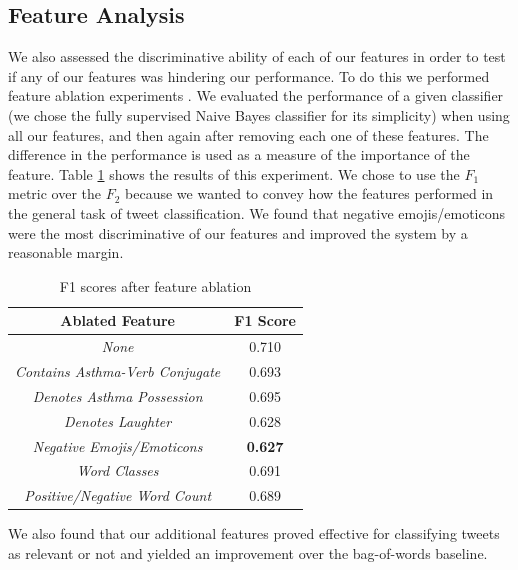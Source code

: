 \documentclass[10pt,letterpaper]{article}
\begin{document}
\subsection{Feature Analysis}
We also assessed the discriminative ability of each of our features in order to test if any of our features was hindering our performance. To do this we performed feature ablation experiments \cite{REF62}. We evaluated the performance of a given classifier (we chose the fully supervised Naive Bayes classifier for its simplicity) when using all our features, and then again after removing each one of these features. The difference in the performance is used as a measure of the importance of the feature. Table \ref{table:4} shows the results of this experiment. We chose to use the $F_1$ metric over the $F_2$ because we wanted to convey how the features performed in the general task of tweet classification. We found that negative emojis/emoticons were the most discriminative of our features and improved the system by a reasonable margin. 
\begin{table}[h!]
\centering
\begin{tabular}{ | c | c | }
  \hline
  \textbf{Ablated Feature} & \textbf{F1 Score} \\
  \hline
  \textit{None} & 0.710 \\
  \textit{Contains Asthma-Verb Conjugate} & 0.693 \\
  \textit{Denotes Asthma Possession} & 0.695 \\
  \textit{Denotes Laughter} & 0.628 \\
  \textit{Negative Emojis/Emoticons} & \textbf{0.627} \\
  \textit{Word Classes} & 0.691 \\
  \textit{Positive/Negative Word Count} & 0.689\\
  \hline
\end{tabular}
\caption{F1 scores after feature ablation}
\label{table:4}
\end{table}
%
We also found that our additional features proved effective for classifying tweets as relevant or not and yielded an improvement over the bag-of-words baseline.
\end{document}
